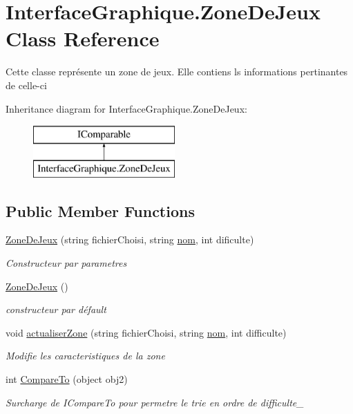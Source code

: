 \hypertarget{class_interface_graphique_1_1_zone_de_jeux}{\section{Interface\-Graphique.\-Zone\-De\-Jeux Class Reference}
\label{class_interface_graphique_1_1_zone_de_jeux}
}


Cette classe représente un zone de jeux. Elle contiens ls informations pertinantes de celle-\/ci  


Inheritance diagram for Interface\-Graphique.\-Zone\-De\-Jeux\-:\begin{figure}[H]
\begin{center}
\leavevmode
\includegraphics[height=2.000000cm]{class_interface_graphique_1_1_zone_de_jeux}
\end{center}
\end{figure}
\subsection*{Public Member Functions}
\begin{DoxyCompactItemize}
\item 
\hyperlink{class_interface_graphique_1_1_zone_de_jeux_afbc2cbd18327b51da80c08ebe39f1101}{Zone\-De\-Jeux} (string fichier\-Choisi, string \hyperlink{group__inf2990_gabe308d273ff51ad86ff02ef3ba3b6f0e}{nom}, int dificulte)
\begin{DoxyCompactList}\small\item\em Constructeur par parametres \end{DoxyCompactList}\item 
\hyperlink{class_interface_graphique_1_1_zone_de_jeux_acaa8405f5a257643abcc7adc1cc37295}{Zone\-De\-Jeux} ()
\begin{DoxyCompactList}\small\item\em constructeur par défault \end{DoxyCompactList}\item 
void \hyperlink{class_interface_graphique_1_1_zone_de_jeux_a06c81248cf3480b6ab3cb06fb22f33d8}{actualiser\-Zone} (string fichier\-Choisi, string \hyperlink{group__inf2990_gabe308d273ff51ad86ff02ef3ba3b6f0e}{nom}, int difficulte)
\begin{DoxyCompactList}\small\item\em Modifie les caracteristiques de la zone \end{DoxyCompactList}\item 
int \hyperlink{class_interface_graphique_1_1_zone_de_jeux_af8418ecfcea244286b3cda1fc9d9a41f}{Compare\-To} (object obj2)
\begin{DoxyCompactList}\small\item\em Surcharge de I\-Compare\-To pour permetre le trie en ordre de difficulte\-\_\- \end{DoxyCompactList}\end{DoxyCompactItemize}
